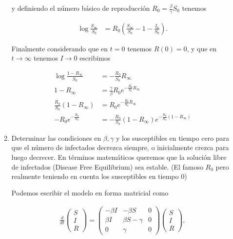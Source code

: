 \documentclass[answers]{exam}
\begin{document}
\begin{questions}
\begin{enumerate}
\begin{enumerate}
\begin{solution}
y definiendo el número básico de reproducción $R_0 = \frac{\beta}{\gamma}S_0$ tenemos

\begin{align*}
    \log{\frac{S_\infty}{S_0}} &= R_0\left(\frac{S_\infty}{S_0} - 1 - \frac{I_0}{S_0}\right).
\end{align*}

Finalmente considerando que en $t = 0$ tenemos $R(0) = 0$, y que en $t \to \infty$ tenemos $I \to 0$ escribimos

\begin{align*}
    \log{\frac{1 - R_\infty}{S_0}} &= -\frac{R_0}{S_0}R_\infty\\
    1 - R_\infty &= \frac{\gamma}{\beta}R_0e^{-\frac{R_0}{S_0}R_\infty}\\
    \frac{R_0}{S_0}(1 - R_\infty) &= R_0e^{-\frac{R_0}{S_0}R_\infty}\\
    -R_0e^{-\frac{R_0}{S_0}} &= -\frac{R_0}{S_0}(1 - R_\infty)e^{-\frac{R_0}{S_0}(1 - R_\infty)}
\end{align*}
\end{solution}

\item Determinar las condiciones en $\beta,\gamma$ y los susceptibles en tiempo cero para que el n\'umero de infectados decrezca siempre, o inicialmente crezca para luego decrecer. En términos matemáticos queremos que la solución libre de infectados (Disease Free Equilibrium) sea estable. (El famoso $R_0$ pero realmente teniendo en cuenta  los susceptibles en tiempo $0$)

\begin{solution}
Podemos escribir el modelo en forma matricial como

\begin{align*}
    \frac{d}{dt}\begin{pmatrix}
                    S\\
                    I\\
                    R
                \end{pmatrix} = \begin{pmatrix}
                    -\beta I & -\beta S & 0\\
                    \beta I & \beta S - \gamma & 0\\
                    0 & \gamma & 0
                \end{pmatrix}\begin{pmatrix}
                    S\\
                    I\\
                    R
                \end{pmatrix},
\end{align*}


\end{solution}
\end{enumerate}
\end{enumerate}
\end{questions}
\end{document}
